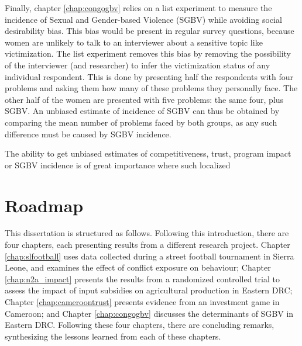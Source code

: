 Finally, chapter \ref{chap:congogbv} relies on a list experiment to measure the incidence of Sexual and Gender-based Violence (SGBV) while avoiding social desirability bias. This bias would be present in regular survey questions, because women are unlikely to talk to an interviewer about a sensitive topic like victimization. The list experiment removes this bias by removing the possibility of the interviewer (and researcher) to infer the victimization status of any individual respondent. This is done by presenting half the respondents with four problems and asking them how many of these problems they personally face. The other half of the women are presented with five problems: the same four, plus SGBV. An unbiased estimate of incidence of SGBV can thus be obtained by comparing the mean number of problems faced by both groups, as any such difference must be caused by SGBV incidence. 

The ability to get unbiased estimates of competitiveness, trust, program impact or SGBV incidence is of great importance where such localized 

\section{Roadmap}
This dissertation is structured as follows. Following this introduction, there are four chapters, each presenting results from a different research project. Chapter \ref{chap:slfootball} uses data collected during a street football tournament in Sierra Leone, and examines the effect of conflict exposure on behaviour; Chapter \ref{chap:n2a_impact} presents the results from a randomized controlled trial to assess the impact of input subsidies on agricultural production in Eastern DRC; Chapter \ref{chap:cameroontrust} presents evidence from an investment game in Cameroon; and Chapter \ref{chap:congogbv} discusses the determinants of SGBV in Eastern DRC. Following these four chapters, there are concluding remarks, synthesizing the lessons learned from each of these chapters.



\clearpage 

